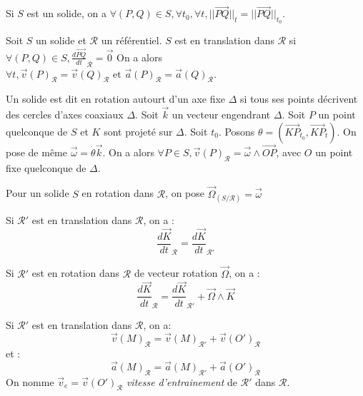 
\newcommand{\refe}{\mathscr{R}}
\newcommand{\der}[1]{\frac{d#1}{dt}}

\begin{prop} Si $S$ est un solide, on a $\forall (P,Q)\in S, \forall t_0, \forall t, ||\vec{PQ}||_t = ||\vec{PQ}||_{t_0}$.
\end{prop}

\begin{defi} Soit $S$ un solide et $\mathscr{R}$ un référentiel. $S$ est en translation dans $\mathscr{R}$ si $\forall (P,Q)\in S, \frac{d\vec{PQ}}{dt}_{\mathscr{R}} = \vec{0}$
    On a alors $\forall t, \vec{v}(P)_\refe = \vec{v}(Q)_\refe \text{ et } \vec{a}(P)_\refe = \vec{a}(Q)_\refe$.
\end{defi}

\begin{defi} Un solide est dit en rotation autourt d'un axe fixe $\Delta$ si tous ses points décrivent des cercles d'axes coaxiaux $\Delta$.
    Soit $\vec{k}$ un vecteur engendrant $\Delta$. Soit $P$ un point quelconque de $S$ et $K$ sont projeté sur $\Delta$. Soit $t_0$. Posons $\theta = (\vec{KP}_{t_0}, \vec{KP}_t)$. On pose de même $\vec{\omega} = \dot{\theta}\vec{k}$. On a alors $\forall P\in S, \vec{v}(P)_\refe = \vec{\omega}\wedge\vec{OP}$, avec $O$ un point fixe quelconque de $\Delta$.
\end{defi}

\begin{defi} Pour un solide $S$ en rotation dans $\refe$, on pose $\vec{\Omega}_{(S/\refe)} = \vec{\omega}$
\end{defi}

\begin{lemme} Si $\refe'$ est en translation dans $\refe$, on a :
    \[ \der{\vec{K}}_\refe = \der{\vec{K}}_{\refe'} \]
\end{lemme}

\begin{lemme} Si $\refe'$ est en rotation dans $\refe$ de vecteur rotation $\vec{\Omega}$, on a :
    \[ \der{\vec{K}}_\refe = \der{\vec{K}}_{\refe'} + \vec{\Omega}\wedge\vec{K} \]
\end{lemme}

\begin{lemme} Si $\refe'$ est en translation dans $\refe$, on a:
    \[\vec{v}(M)_\refe = \vec{v}(M)_{\refe'} + \vec{v}(O')_\refe \]
    et :
    \[ \vec{a}(M)_\refe = \vec{a}(M)_{\refe'} + \vec{a}(O')_\refe \]
    On nomme $\vec{v}_e = \vec{v}(O')_\refe$ \emph{vitesse d'entrainement} de $\refe'$ dans $\refe$.
\end{lemme}

